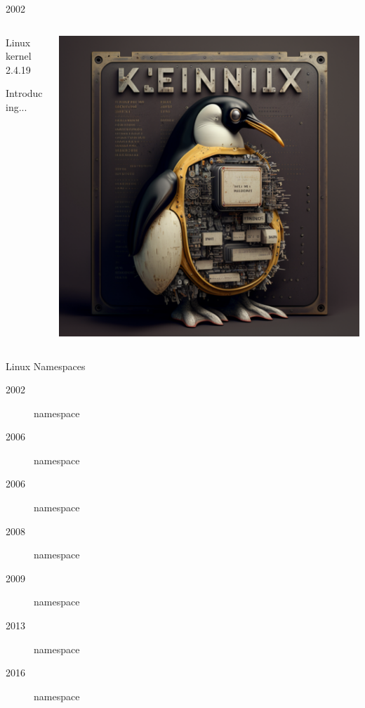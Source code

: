 \documentclass{slide}
\begin{document}
\begin{frame}{2002}
    \begin{columns}
    \begin{column}{0.3\textwidth}
    {\color{primary}\Large Linux kernel 2.4.19}
    \vspace{1em}

    \large Introducing... 
    \end{column}
    \begin{column}{0.7\textwidth}
    \begin{center}
    \includegraphics[height=0.8\textheight]{images/linux-kernel}
    \end{center}
    \end{column}
    \end{columns}

\end{frame}

\begin{frame}{Linux Namespaces}
    {\LARGE
    \begin{description}
        \item[2002]  namespace
        \item[2006]  namespace
        \item[2006]  namespace
        \item[2008]  namespace
        \item[2009]  namespace
        \item[2013]  namespace
        \item[2016]  namespace
    \end{description}
    }
\end{frame}
\end{document}
